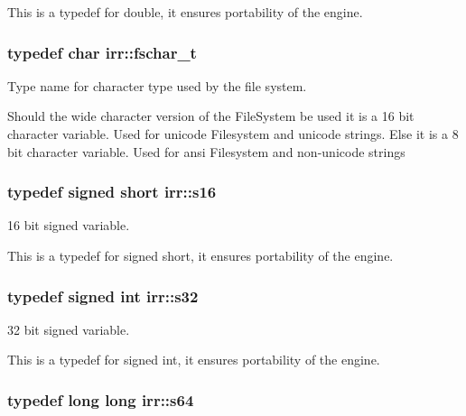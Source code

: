 This is a typedef for double, it ensures portability of the engine. 
\subsubsection[{\texorpdfstring{fschar\+\_\+t}{fschar\_t}}]{\setlength{\rightskip}{0pt plus 5cm}typedef char {\bf irr\+::fschar\+\_\+t}}\hypertarget{namespaceirr_a813cca9bac9fa0c1427d89720a451460}{}\label{namespaceirr_a813cca9bac9fa0c1427d89720a451460}


Type name for character type used by the file system. 

Should the wide character version of the File\+System be used it is a 16 bit character variable. Used for unicode Filesystem and unicode strings. Else it is a 8 bit character variable. Used for ansi Filesystem and non-\/unicode strings 
\subsubsection[{\texorpdfstring{s16}{s16}}]{\setlength{\rightskip}{0pt plus 5cm}typedef signed short {\bf irr\+::s16}}\hypertarget{namespaceirr_a43ace0af066371ac0862bac3f7314220}{}\label{namespaceirr_a43ace0af066371ac0862bac3f7314220}


16 bit signed variable. 

This is a typedef for signed short, it ensures portability of the engine. 
\subsubsection[{\texorpdfstring{s32}{s32}}]{\setlength{\rightskip}{0pt plus 5cm}typedef signed int {\bf irr\+::s32}}\hypertarget{namespaceirr_ac66849b7a6ed16e30ebede579f9b47c6}{}\label{namespaceirr_ac66849b7a6ed16e30ebede579f9b47c6}


32 bit signed variable. 

This is a typedef for signed int, it ensures portability of the engine. 
\subsubsection[{\texorpdfstring{s64}{s64}}]{\setlength{\rightskip}{0pt plus 5cm}typedef long long {\bf irr\+::s64}}\hypertarget{namespaceirr_abf54bd535f8d4dd996270e68c3ad8c08}{}\label{namespaceirr_abf54bd535f8d4dd996270e68c3ad8c08}


